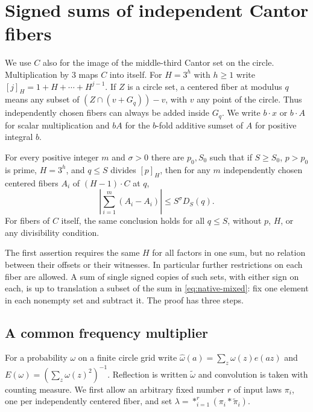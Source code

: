 \section{Signed sums of independent Cantor fibers}\label{sec:native}

We use $C$ also for the image of the middle-third Cantor set on the
circle. Multiplication by $3$ maps $C$ into itself. For $H=3^h$ with
$h\ge1$ write $[j]_H=1+H+\cdots+H^{j-1}$. If $Z$ is a circle set,
a centered fiber at modulus $q$ means any subset of
$(Z\cap (v+G_q))-v$, with $v$ any point of the circle. Thus independently
chosen fibers can always be added inside $G_q$. We write $b\cdot x$
or $b\cdot A$ for scalar multiplication and $bA$ for the $b$-fold
additive sumset of $A$ for positive integral $b$.

\begin{theorem}\label{thm:native}
For every positive integer $m$ and $\sigma>0$ there are $p_0,S_0$
such that if $S\ge S_0$, $p>p_0$ is prime, $H=3^h$, and
$q\le S$ divides $[p]_H$, then for any $m$ independently chosen
centered fibers $A_i$ of $(H-1)\cdot C$ at $q$,
\begin{equation}\label{eq:native-mixed}
 \left|\sum_{i=1}^m(A_i-A_i)\right|\le S^\sigma D_S(q).
\end{equation}
For fibers of $C$ itself, the same conclusion holds for all $q\le S$,
without $p$, $H$, or any divisibility condition.
\end{theorem}

The first assertion requires the same $H$ for all factors in one sum,
but no relation between their offsets or their witnesses. In particular
further restrictions on each fiber are allowed. A sum of single signed
copies of such sets, with either sign on each, is up to translation a
subset of the sum in \eqref{eq:native-mixed}: fix one element in each
nonempty set and subtract it. The proof has three steps.

\subsection*{A common frequency multiplier}
For a probability $\omega$ on a finite circle grid write
$\widehat\omega(a)=\sum_z \omega(z)e(az)$ and
$E(\omega)=(\sum_z\omega(z)^2)^{-1}$. Reflection is written
$\widetilde\omega$ and convolution is taken with counting measure.
We first allow an arbitrary fixed number $r$ of input laws $\pi_i$,
one per independently centered fiber, and set
$\lambda=\mathop{*}_{i=1}^r(\pi_i*\widetilde\pi_i)$.

